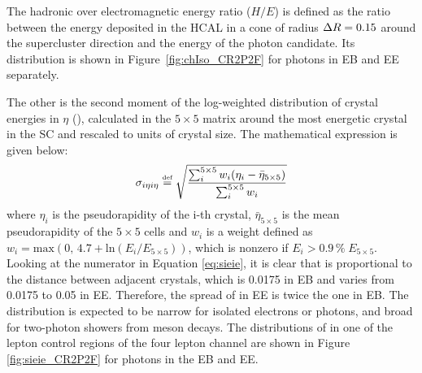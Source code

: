 The hadronic over electromagnetic energy ratio ($H/E$) is defined as the ratio between the energy deposited in the HCAL in a cone of radius $\Delta R = 0.15$
around the supercluster direction and the energy of the photon candidate.
Its distribution is shown in Figure~\ref{fig:chIso_CR2P2F} for photons in EB and EE separately.

The other is the second moment of the log-weighted distribution of crystal energies in $\eta$ (\sieie),
calculated in the $5 \times 5$ matrix around the most energetic crystal in the SC and rescaled to units of crystal size.
The mathematical expression is given below:
\begin{equation}
\label{eq:sieie}
\sigma_{i \eta i \eta} \stackrel{\text{\tiny def}}{=} \sqrt{ \frac{\sum_i^{5 \times 5} w_i(\eta_i - \bar{\eta}_{5 \times 5})}{\sum_i^{5 \times 5} w_i} }
\end{equation}
where $\eta_i$ is the pseudorapidity of the i-th crystal,
$\bar{\eta}_{5 \times 5}$ is the mean pseudorapidity of the $5 \times 5$ cells
and $w_i$ is a weight defined as $w_i = \mathrm{max}(0,\, 4.7 + \mathrm{ln}(E_i/E_{5 \times 5}))$,
which is nonzero if $E_i > 0.9\, \%\; E_{5 \times 5}$.
Looking at the numerator in Equation \ref{eq:sieie}, it is clear that \sieie is proportional to the distance between adjacent crystals,
which is 0.0175 in EB and varies from 0.0175 to 0.05 in EE.
Therefore, the spread of \sieie in EE is twice the one in EB.
The \sieie distribution is expected to be narrow for isolated electrons or photons, and broad for two-photon showers from meson decays.
The distributions of \sieie in one of the lepton control regions of the four lepton channel
are shown in Figure \ref{fig:sieie_CR2P2F} for photons in the EB and EE.

